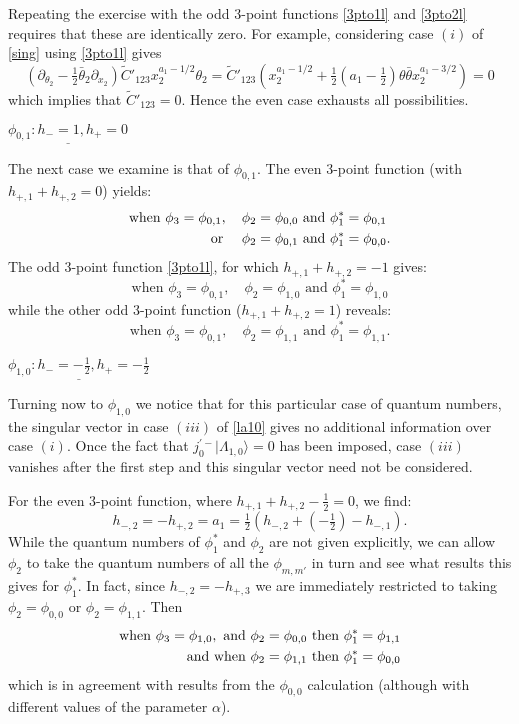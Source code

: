 \documentclass[a4paper,12pt]{article}
\def\t           {\tilde}
\def\thetabar    {\bar{\theta}}
\def\hf          {\tfrac{1}{2}}
\begin{document}
Repeating the exercise with the odd 3-point functions
\eqref{3pto1l} and \eqref{3pto2l} requires that these are identically
zero.  For example, considering case $(i)$ of \eqref{sing} using
\eqref{3pto1l} gives
\begin{equation}
(\partial_{\theta_2}-\hf\thetabar_2 \partial_{x_2})
\t{C}'_{123} x_2^{a_1-1/2}\theta_2 =
\t{C}'_{123}\left(x_2^{a_1-1/2}+\hf\left(a_1-\hf\right)\theta\thetabar
x_2^{a_1-3/2}\right) =0 
\end{equation}
which implies that $\t{C}'_{123}=0$.  Hence the even case exhausts all
possibilities.   


$\underline{\phi_{0,1}: h_-=1,h_+=0}$

The next case we examine is that of $\phi_{0,1}$.  The even 3-point
function (with $h_{+,1}+h_{+,2}=0$) yields:
\begin{align}
\textrm{when } \phi_3=\phi_{0,1},\, \quad& \phi_2=\phi_{0,0}
\textrm{ and } \phi^*_1=\phi_{0,1}\notag\\
\textrm{or } \quad& \phi_2=\phi_{0,1} \textrm{ and } \phi^*_1=\phi_{0,0}.
\end{align}
The odd 3-point function \eqref{3pto1l}, for which
$h_{+,1}+h_{+,2}=-1$ gives:
\begin{equation}
\textrm{when } \phi_3=\phi_{0,1},\quad \phi_2=\phi_{1,0} 
\textrm{ and } \phi^*_1=\phi_{1,0} 
\end{equation}
while the other odd 3-point function ($h_{+,1}+h_{+,2}=1$) reveals:
\begin{equation}
\textrm{when } \phi_3=\phi_{0,1},\quad \phi_2=\phi_{1,1} 
\textrm{ and } \phi^*_1=\phi_{1,1}. 
\end{equation} 



$\underline{\phi_{1,0}: h_-=-\hf,h_+=-\hf}$

Turning now to $\phi_{1,0}$ we notice that for this particular case of
quantum numbers, the singular vector in case $(iii)$ of \eqref{la10}
gives no additional information over case $(i)$.  Once the fact that
$j^{'-}_0|\Lambda_{1,0}\rangle=0$ has been imposed, case $(iii)$ vanishes
after the first step and this singular vector need not be considered.

For the even 3-point function, where $h_{+,1}+h_{+,2}-\hf=0$, we find:
\begin{equation}
h_{-,2}=-h_{+,2}=a_1=\hf \left(h_{-,2}+\left(-\hf\right)-h_{-,1}\right).
\end{equation}
While the quantum numbers of $\phi^*_1$ and $\phi_2$ are not given
explicitly, we can allow $\phi_2$ to take the quantum numbers of all
the $\phi_{m,m'}$ in turn and see what results this gives for
$\phi^*_1$.  In fact, since $h_{-,2}=-h_{+,3}$ we are immediately
restricted to taking $\phi_2=\phi_{0,0}$ or $\phi_2=\phi_{1,1}$.  Then
\begin{align}
\textrm{when } \phi_3=\phi_{1,0}, \textrm{ and } & \phi_2=\phi_{0,0}
\textrm{ then } \phi^*_1=\phi_{1,1}\notag\\ 
\textrm{and when } & \phi_2=\phi_{1,1} \textrm{ then }
\phi^*_1=\phi_{0,0} 
\end{align}
which is in agreement with results from the $\phi_{0,0}$ calculation 
(although with different values of the parameter $\alpha$).  
\end{document}
